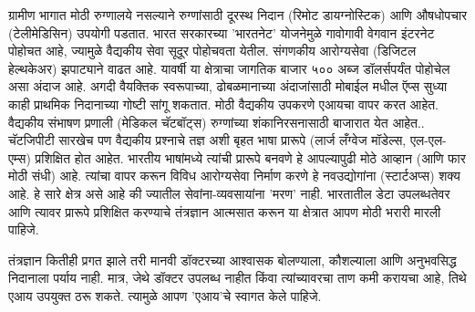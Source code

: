 ग्रामीण भागात मोठी रुग्णालये नसल्याने रुग्णांसाठी दूरस्थ निदान (रिमोट डायग्नोस्टिक) आणि औषधोपचार (टेलीमेडिसिन) उपयोगी पडतात. भारत सरकारच्या 'भारतनेट' योजनेमुळे गावोगावी वेगवान इंटरनेट पोहोचत आहे, ज्यामुळे वैद्यकीय सेवा सूदूर पोहोचवता येतील. संगणकीय आरोग्यसेवा (डिजिटल हेल्थकेअर) झपाट्याने वाढत आहे. यावर्षी या क्षेत्राचा जागतिक बाजार ५०० अब्ज डॉलर्सपर्यंत पोहोचेल असा अंदाज आहे. अगदी वैयक्तिक स्वरूपाच्या, ढोबळमानाच्या अंदाजांसाठी मोबाईल मधील ऍप्स सुध्या काही प्राथमिक निदानाच्या गोष्टी सांगू शकतात. मोठी वैद्यकीय उपकरणे एआयचा वापर करत आहेत. वैद्यकीय संभाषण प्रणाली (मेडिकल चॅटबॉट्स) रुग्णांच्या शंकानिरसनासाठी बाजारात येत आहेत.. चॅटजिपीटी सारखेच पण वैद्यकीय प्रश्नाचे तज्ञ अशी बृहत भाषा प्रारूपे (लार्ज लँग्वेज मॉडेल्स, एल-एल-एम्स) प्रशिक्षित होत आहेत. भारतीय भाषांमध्ये त्यांची प्रारूपे बनवणे हे आपल्यापुढी मोठे आव्हान (आणि फार मोठी संधी) आहे. त्यांचा वापर करून विविध आरोग्यसेवा निर्माण करणे हे नवउद्योगांना (स्टार्टअप्स) शक्य आहे. हे सारे क्षेत्र असे आहे की ज्यातील सेवांना-व्यवसायांना 'मरण' नाही. भारतातील डेटा उपलब्धतेवर आणि त्यावर प्रारूपे प्रशिक्षित करण्याचे तंत्रज्ञान आत्मसात करून या क्षेत्रात आपण मोठी भरारी मारली पाहिजे.

तंत्रज्ञान कितीही प्रगत झाले तरी मानवी डॉक्टरच्या आश्वासक बोलण्याला, कौशल्याला आणि अनुभवसिद्ध निदानाला पर्याय नाही. मात्र, जेथे डॉक्टर उपलब्ध नाहीत किंवा त्यांच्यावरचा ताण कमी करायचा आहे, तिथे एआय उपयुक्त ठरू शकते. त्यामुळे आपण 'एआय'चे स्वागत केले पाहिजे.